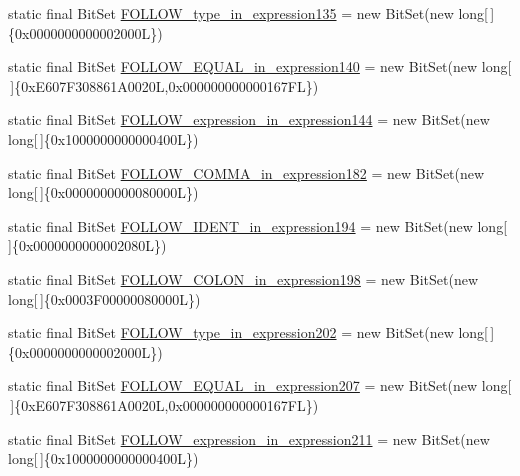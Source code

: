 \begin{DoxyCompactItemize}
\item 
static final Bit\-Set \hyperlink{classorg_1_1tzi_1_1use_1_1parser_1_1ocl_1_1_o_c_l_parser_a4dfcedef0c2d6915f86ccaf927b08a87}{F\-O\-L\-L\-O\-W\-\_\-type\-\_\-in\-\_\-expression135} = new Bit\-Set(new long\mbox{[}$\,$\mbox{]}\{0x0000000000002000\-L\})
\item 
static final Bit\-Set \hyperlink{classorg_1_1tzi_1_1use_1_1parser_1_1ocl_1_1_o_c_l_parser_af941f2e914dc3d251668bbac9768910d}{F\-O\-L\-L\-O\-W\-\_\-\-E\-Q\-U\-A\-L\-\_\-in\-\_\-expression140} = new Bit\-Set(new long\mbox{[}$\,$\mbox{]}\{0x\-E607\-F308861\-A0020\-L,0x000000000000167\-F\-L\})
\item 
static final Bit\-Set \hyperlink{classorg_1_1tzi_1_1use_1_1parser_1_1ocl_1_1_o_c_l_parser_a70f1922699b3bb6e855d94520ce6bbf7}{F\-O\-L\-L\-O\-W\-\_\-expression\-\_\-in\-\_\-expression144} = new Bit\-Set(new long\mbox{[}$\,$\mbox{]}\{0x1000000000000400\-L\})
\item 
static final Bit\-Set \hyperlink{classorg_1_1tzi_1_1use_1_1parser_1_1ocl_1_1_o_c_l_parser_adcbacc00683830ee6b521312331744cb}{F\-O\-L\-L\-O\-W\-\_\-\-C\-O\-M\-M\-A\-\_\-in\-\_\-expression182} = new Bit\-Set(new long\mbox{[}$\,$\mbox{]}\{0x0000000000080000\-L\})
\item 
static final Bit\-Set \hyperlink{classorg_1_1tzi_1_1use_1_1parser_1_1ocl_1_1_o_c_l_parser_a4a2742dc18bda7b9f4a3a612db5d6353}{F\-O\-L\-L\-O\-W\-\_\-\-I\-D\-E\-N\-T\-\_\-in\-\_\-expression194} = new Bit\-Set(new long\mbox{[}$\,$\mbox{]}\{0x0000000000002080\-L\})
\item 
static final Bit\-Set \hyperlink{classorg_1_1tzi_1_1use_1_1parser_1_1ocl_1_1_o_c_l_parser_a3c8cc9a27473acb2aa9a28445fc7f07f}{F\-O\-L\-L\-O\-W\-\_\-\-C\-O\-L\-O\-N\-\_\-in\-\_\-expression198} = new Bit\-Set(new long\mbox{[}$\,$\mbox{]}\{0x0003\-F00000080000\-L\})
\item 
static final Bit\-Set \hyperlink{classorg_1_1tzi_1_1use_1_1parser_1_1ocl_1_1_o_c_l_parser_a8a0eb63deef78fe6aa27fddfae64f92b}{F\-O\-L\-L\-O\-W\-\_\-type\-\_\-in\-\_\-expression202} = new Bit\-Set(new long\mbox{[}$\,$\mbox{]}\{0x0000000000002000\-L\})
\item 
static final Bit\-Set \hyperlink{classorg_1_1tzi_1_1use_1_1parser_1_1ocl_1_1_o_c_l_parser_aa67ccaf1c19555d908a0ceb431590259}{F\-O\-L\-L\-O\-W\-\_\-\-E\-Q\-U\-A\-L\-\_\-in\-\_\-expression207} = new Bit\-Set(new long\mbox{[}$\,$\mbox{]}\{0x\-E607\-F308861\-A0020\-L,0x000000000000167\-F\-L\})
\item 
static final Bit\-Set \hyperlink{classorg_1_1tzi_1_1use_1_1parser_1_1ocl_1_1_o_c_l_parser_aebd7964d4a2a8fb167ca1ab556e8c60d}{F\-O\-L\-L\-O\-W\-\_\-expression\-\_\-in\-\_\-expression211} = new Bit\-Set(new long\mbox{[}$\,$\mbox{]}\{0x1000000000000400\-L\})

\end{DoxyCompactItemize}
